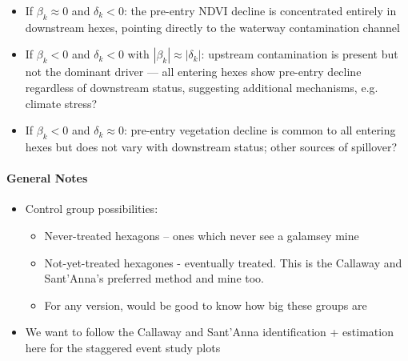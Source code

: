 \documentclass[12pt]{article}
\begin{document}
\begin{itemize}
\begin{itemize}
    \item If $\beta_k \approx 0$ and $\delta_k < 0$: the pre-entry NDVI decline is concentrated entirely in downstream hexes, pointing directly to the waterway contamination channel
    \item If $\beta_k < 0$ and $\delta_k < 0$ with $|\beta_k| \approx |\delta_k|$: upstream contamination is present but not the dominant driver --- all entering hexes show pre-entry decline regardless of downstream status, suggesting additional mechanisms, e.g. climate stress?
    \item If $\beta_k < 0$ and $\delta_k \approx 0$: pre-entry vegetation decline is common to all entering hexes but does not vary with downstream status; other sources of spillover?
\end{itemize}
\end{itemize}

\paragraph{General Notes}
\begin{itemize}
    \item Control group possibilities:
\begin{itemize}
    \item Never-treated hexagons -- ones which never see a galamsey mine
    \item Not-yet-treated hexagones - eventually treated. This is the Callaway and Sant'Anna's preferred method and mine too.
    \item For any version, would be good to know how big these groups are 
\end{itemize}
\item We want to follow the Callaway and Sant'Anna identification + estimation here for the staggered event study plots
\end{itemize}
\end{document}
